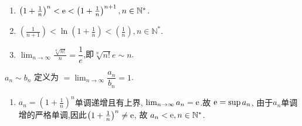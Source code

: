 \begin{example}\label{example:e_n_2}
    \begin{enumerate}
        \item $\left(1+\frac 1n \right)^n < \mathrm{e} < \left(1+\frac 1n \right)^{n+1}, n \in \mathbb{N}^*$.
        \item $\left(\frac{1}{n+1} \right) < \ln \left(1+\frac 1n \right) < \left(\frac 1n \right), n \in \mathbb{N}^*$.
        \item $\lim_{n \to \infty} \frac {\sqrt[n]{n!}}{n} = \dfrac 1e$,即$\sqrt[n]{n!}e \sim n$.
    \end{enumerate}

    \begin{remark}
        $ a_n \sim b_n$ 定义为 $= \lim_{n \to \infty} \dfrac{a_n}{b_n} = 1$.
    \end{remark}

    \begin{solution}
        \begin{enumerate}
            \item $a_n = \left(1+\frac 1n \right)^n$单调递增且有上界, $\lim_{n \to \infty} a_n = \mathrm{e}$.故 $ \mathrm{e} = \sup a_n$, 由于$a_n$单调增的严格单调,因此$\left(1+\frac 1n \right)^n \neq \mathrm{e}$, 故 $a_n < \mathrm{e}, n \in \mathbb{N}^*$.


\end{enumerate}
\end{solution}
\end{example}
